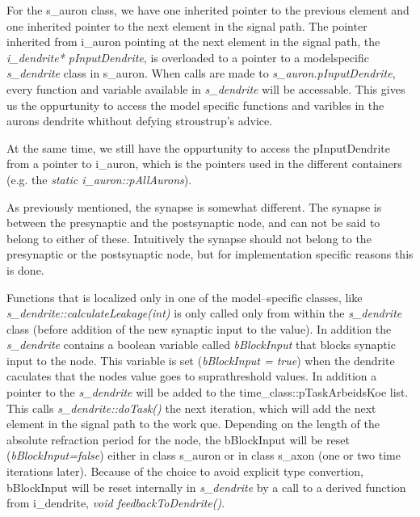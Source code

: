 	For the s\_auron class, we have one inherited pointer to the previous element and one inherited pointer to the next element in the signal path.
	The pointer inherited from i\_auron pointing at the next element in the signal path, the \emph{i\_dendrite* pInputDendrite}, is overloaded to a pointer to a modelspecific \emph{s\_dendrite} class in s\_auron.
	When calls are made to \emph{s\_auron.pInputDendrite}, every function and variable available in \emph{s\_dendrite} will be accessable.
	This gives us the oppurtunity to access the model specific functions and varibles in the aurons dendrite whithout defying stroustrup's advice.

	At the same time, we still have the oppurtunity to access the pInputDendrite from a pointer to i\_auron, which is the pointers used in the different containers (e.g. the \emph{static i\_auron::pAllAurons}).
	
	As previously mentioned, the synapse is somewhat different. 
	The synapse is between the presynaptic and the postsynaptic node, and can not be said to belong to either of these. 
	Intuitively the synapse should not belong to the presynaptic or the postsynaptic node, but for implementation specific reasons this is done.





	Functions that is localized only in one of the model--specific classes, like \emph{s\_dendrite::calculateLeakage(int)} is only called only from within the \emph{s\_dendrite} class (before addition of the new synaptic input to the value).
	In addition the \emph{s\_dendrite} contains a boolean variable called \emph{bBlockInput} that blocks synaptic input to the node. 
	This variable is set (\emph{bBlockInput = true}) when the dendrite caculates that the nodes value goes to suprathreshold values. In addition a pointer to the \emph{s\_dendrite} will be added to the time\_class::pTaskArbeidsKoe list.
	This calls \emph{s\_dendrite::doTask()} the next iteration, which will add the next element in the signal path to the work que.
	Depending on the length of the absolute refraction period for the node, the bBlockInput will be reset (\emph{bBlockInput=false}) either in class s\_auron or in class s\_axon (one or two time iterations later).
	Because of the choice to avoid explicit type convertion, bBlockInput will be reset internally in \emph{s\_dendrite} by a call to a derived function from i\_dendrite, \emph{void feedbackToDendrite()}.


